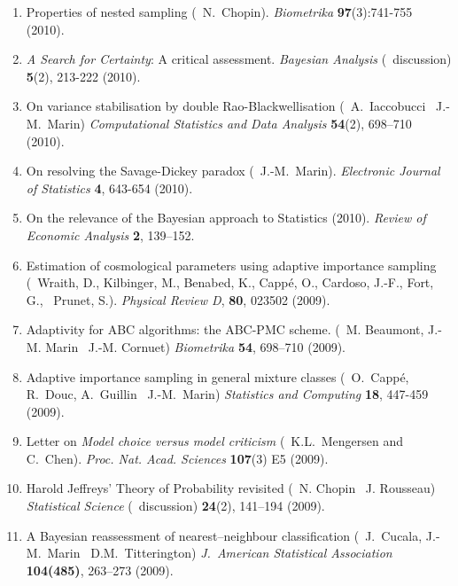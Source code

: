 \begin{enumerate}
\item Properties of nested sampling (\avec\ N.~Chopin). {\em Biometrika} {\bf 97}(3):741-755 (2010).

\item {\em A Search for Certainty}: A critical assessment. {\em Bayesian Analysis} (\avec~discussion) {\bf 5}(2), 213-222 (2010).

\item On variance stabilisation by double Rao-Blackwellisation (\avec\ A.~Iaccobucci \et\ J.-M.~Marin) 
{\em Computational Statistics and Data Analysis} {\bf 54}(2), 698--710 (2010).

\item On resolving the Savage-Dickey paradox (\avec~J.-M.~Marin).
{\em Electronic Journal of Statistics} {\bf 4}, 643-654 (2010).

\item On the relevance of the Bayesian approach to Statistics (2010). {\em Review of Economic Analysis} {\bf
2}, 139--152.

\item 
Estimation of cosmological parameters using adaptive importance sampling (\avec\
Wraith, D., Kilbinger, M., Benabed, K., Capp\'e, O., Cardoso, J.-F., Fort, G., \et\ Prunet, S.).
{\em Physical Review D}, {\bf 80}, 023502 (2009).

\item Adaptivity for ABC algorithms: the ABC-PMC scheme. (\avec\ M. Beaumont, J.-M. Marin \et\ J.-M. Cornuet)
{\em Biometrika} {\bf 54}, 698--710 (2009).

\item Adaptive importance sampling in general mixture classes
(\avec\ O.~Capp\'e,  R.~Douc, A.~Guillin \et\ J.-M.~Marin) 
{\em Statistics and Computing} {\bf 18},  447-459 (2009).

\item Letter on {\em Model choice versus model criticism} (\avec\ K.L.~Mengersen and C.~Chen).
{\em Proc. Nat. Acad. Sciences} {\bf 107}(3) E5 (2009).

\item Harold Jeffreys' Theory of Probability revisited (\avec\ N. Chopin \et\ J. Rousseau)
{\em Statistical Science} (\avec\ discussion) {\bf 24}(2), 141--194 (2009).

\item A Bayesian reassessment of nearest--neighbour classification
(\avec\ J.~Cucala, J.-M.~Marin \et\ D.M.~Titterington)
{\em J.~American Statistical Association} {\bf 104(485)}, 263--273 (2009).


\end{enumerate}
